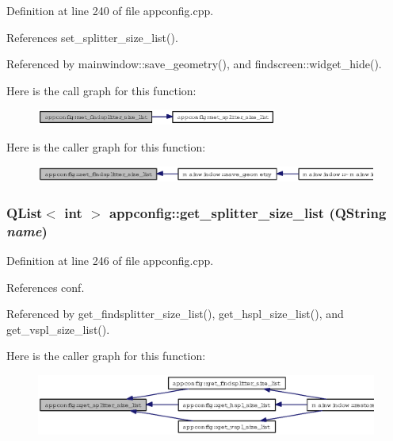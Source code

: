 Definition at line 240 of file appconfig.cpp.

References set\_\-splitter\_\-size\_\-list().

Referenced by mainwindow::save\_\-geometry(), and findscreen::widget\_\-hide().

Here is the call graph for this function:\begin{figure}[H]
\begin{center}
\leavevmode
\includegraphics[width=224pt]{classappconfig_3d381a23dd11f7c1eaa9516ba2a069da_cgraph}
\end{center}
\end{figure}


Here is the caller graph for this function:\begin{figure}[H]
\begin{center}
\leavevmode
\includegraphics[width=317pt]{classappconfig_3d381a23dd11f7c1eaa9516ba2a069da_icgraph}
\end{center}
\end{figure}
\subsubsection{\setlength{\rightskip}{0pt plus 5cm}QList$<$ int $>$ appconfig::get\_\-splitter\_\-size\_\-list (QString {\em name})}\label{classappconfig_2e35d75471242db7840adf8058c861d4}




Definition at line 246 of file appconfig.cpp.

References conf.

Referenced by get\_\-findsplitter\_\-size\_\-list(), get\_\-hspl\_\-size\_\-list(), and get\_\-vspl\_\-size\_\-list().

Here is the caller graph for this function:\begin{figure}[H]
\begin{center}
\leavevmode
\includegraphics[width=371pt]{classappconfig_2e35d75471242db7840adf8058c861d4_icgraph}
\end{center}
\end{figure}
